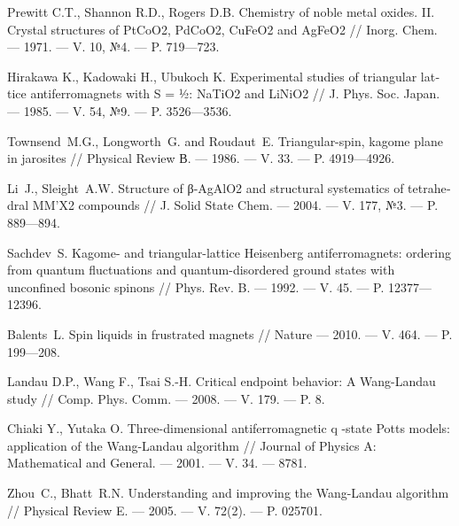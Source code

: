 \begin{thebibliography}{11}
Prewitt C.T., Shannon R.D., Rogers D.B.
Chemistry of noble metal oxides. II. Crystal structures of PtCoO2, PdCoO2, CuFeO2 and AgFeO2
//
Inorg. Chem.
--- 1971.
--- V. 10, №4.
--- P. 719---723.





\foreignlanguage{english}{%
Hirakawa K., Kadowaki H., Ubukoch K.
Experimental studies of triangular lattice antiferromagnets with S = ½: NaTiO2 and LiNiO2
//
J. Phys. Soc. Japan.
--- 1985.
--- V. 54, №9.
--- P. 3526---3536.
}%

Townsend~M.G., Longworth~G. and Roudaut~E.
Triangular-spin, kagome plane in jarosites 
// 
Physical Review В.
--- 1986.
--- V. 33.
--- P. 4919---4926.





\foreignlanguage{english}{%
Li~J., Sleight~A.W. 
Structure of β-AgAlO2 and structural systematics of tetrahedral MM'X2
compounds 
// 
J. Solid State Chem. 
--- 2004. 
--- V. 177, №3.
--- P. 889---894.
}%

Sachdev~S. 
Kagome- and triangular-lattice Heisenberg antiferromagnets: ordering from quantum fluctuations and quantum-disordered ground states with unconfined bosonic spinons 
//
Phys. Rev. B.
--- 1992.
--- V. 45.
--- P. 12377---12396.





Balents~L. 
Spin liquids in frustrated magnets
// 
Nature
--- 2010.
--- V. 464.
--- P. 199---208.





Landau D.P., Wang F., Tsai S.-H.
Critical endpoint behavior: A Wang-Landau study
//
Comp. Phys. Comm.
--- 2008.
--- V. 179.
--- P. 8.





Chiaki Y., Yutaka O.
Three-dimensional antiferromagnetic q -state Potts models: application of the Wang-Landau algorithm
//
Journal of Physics A: Mathematical and General.
--- 2001.
--- V. 34.
--- 8781.





Zhou~C., Bhatt~R.N. 
Understanding and improving the Wang-Landau algorithm 
//
Physical Review E.
--- 2005.
--- V. 72(2).
--- P. 025701.





\end{thebibliography}
